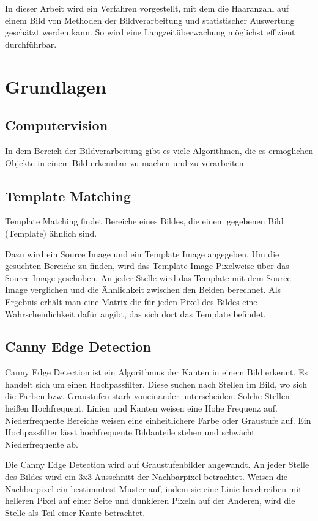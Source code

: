 \documentclass[german,a4paper, 12pt]{llncs}
\begin{document}
In dieser Arbeit wird ein Verfahren vorgestellt, mit dem die Haaranzahl auf einem Bild von Methoden der Bildverarbeitung und statistischer Auswertung geschätzt werden kann. So wird eine Langzeitüberwachung möglichst effizient durchführbar.
\section{Grundlagen}
\subsection{Computervision}
In dem Bereich der Bildverarbeitung gibt es viele Algorithmen, die es ermöglichen Objekte in einem Bild erkennbar zu machen und zu verarbeiten.

\subsection{Template Matching} 

Template Matching findet Bereiche eines Bildes, die einem gegebenen Bild (Template) ähnlich sind.\cite{TemplateMatchingCV}

Dazu wird ein Source Image und ein Template Image angegeben. Um die gesuchten Bereiche zu finden, wird das Template Image Pixelweise über das Source Image geschoben. An jeder Stelle wird das Template mit dem Source Image verglichen und die Ähnlichkeit zwischen den Beiden berechnet. Als Ergebnis erhält man eine Matrix die für jeden Pixel des Bildes eine Wahrscheinlichkeit dafür angibt, das sich dort das Template befindet.\cite{TemplateMatchingCV}

\subsection{Canny Edge Detection}
Canny Edge Detection ist ein Algorithmus der Kanten in einem Bild erkennt. 
Es handelt sich um einen Hochpassfilter. Diese suchen nach Stellen im Bild, wo sich die Farben bzw. Graustufen stark voneinander unterscheiden. Solche Stellen heißen Hochfrequent. Linien und Kanten weisen eine Hohe Frequenz auf. Niederfrequente Bereiche weisen eine einheitlichere Farbe oder Graustufe auf. Ein Hochpassfilter lässt hochfrequente Bildanteile stehen und schwächt Niederfrequente ab. \cite{Canny}

Die Canny Edge Detection wird auf Graustufenbilder angewandt. An jeder Stelle des Bildes wird ein 3x3 Ausschnitt der Nachbarpixel betrachtet. Weisen die Nachbarpixel ein bestimmtest Muster auf, indem sie eine Linie beschreiben mit helleren Pixel auf einer Seite und dunkleren Pixeln auf der Anderen, wird die Stelle als Teil einer Kante betrachtet.\cite{Canny}
\end{document}
